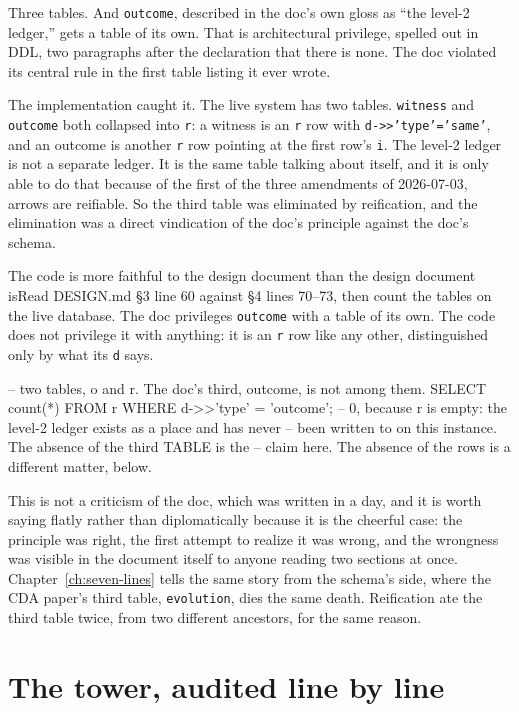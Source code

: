 Three tables. And \texttt{outcome}, described in the doc's own gloss as ``the level-2 ledger,'' gets a table of its own. That is architectural privilege, spelled out in DDL, two paragraphs after the declaration that there is none. The doc violated its central rule in the first table listing it ever wrote.

The implementation caught it. The live system has two tables. \texttt{witness} and \texttt{outcome} both collapsed into \texttt{r}: a witness is an \texttt{r} row with \texttt{d->>'type'='same'}, and an outcome is another \texttt{r} row pointing at the first row's \texttt{i}. The level-2 ledger is not a separate ledger. It is the same table talking about itself, and it is only able to do that because of the first of the three amendments of 2026-07-03, arrows are reifiable. So the third table was eliminated by reification, and the elimination was a direct vindication of the doc's principle against the doc's schema.

\begin{Correspondence}{The code is more faithful to the design document than the design document is}{Read DESIGN.md \S3 line 60 against \S4 lines 70--73, then count the tables on the live database.}
The doc privileges \texttt{outcome} with a table of its own. The code does not privilege it with anything: it is an \texttt{r} row like any other, distinguished only by what its \texttt{d} says.
\begin{Check}
\dt
-- two tables, o and r. The doc's third, outcome, is not among them.
SELECT count(*) FROM r WHERE d->>'type' = 'outcome';
-- 0, because r is empty: the level-2 ledger exists as a place and has never
-- been written to on this instance. The absence of the third TABLE is the
-- claim here. The absence of the rows is a different matter, below.
\end{Check}
This is not a criticism of the doc, which was written in a day, and it is worth saying flatly rather than diplomatically because it is the cheerful case: the principle was right, the first attempt to realize it was wrong, and the wrongness was visible in the document itself to anyone reading two sections at once. Chapter~\ref{ch:seven-lines} tells the same story from the schema's side, where the CDA paper's third table, \texttt{evolution}, dies the same death. Reification ate the third table twice, from two different ancestors, for the same reason.
\end{Correspondence}

\section{The tower, audited line by line}

